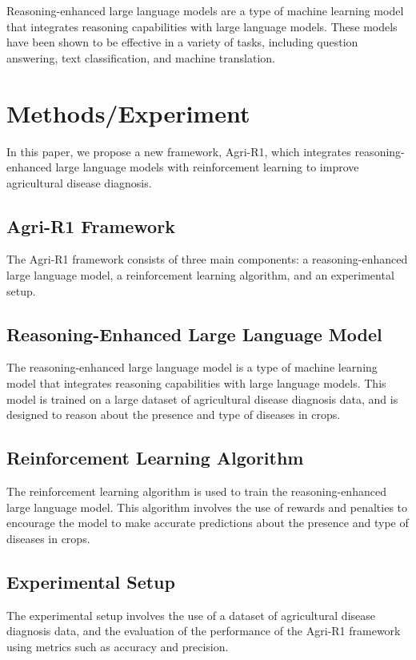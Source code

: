 \documentclass{article}
\begin{document}
Reasoning-enhanced large language models are a type of machine learning model that integrates reasoning capabilities with large language models. These models have been shown to be effective in a variety of tasks, including question answering, text classification, and machine translation.

\section{Methods/Experiment}

In this paper, we propose a new framework, Agri-R1, which integrates reasoning-enhanced large language models with reinforcement learning to improve agricultural disease diagnosis.

\subsection{Agri-R1 Framework}

The Agri-R1 framework consists of three main components: a reasoning-enhanced large language model, a reinforcement learning algorithm, and an experimental setup.

\subsection{Reasoning-Enhanced Large Language Model}

The reasoning-enhanced large language model is a type of machine learning model that integrates reasoning capabilities with large language models. This model is trained on a large dataset of agricultural disease diagnosis data, and is designed to reason about the presence and type of diseases in crops.

\subsection{Reinforcement Learning Algorithm}

The reinforcement learning algorithm is used to train the reasoning-enhanced large language model. This algorithm involves the use of rewards and penalties to encourage the model to make accurate predictions about the presence and type of diseases in crops.

\subsection{Experimental Setup}

The experimental setup involves the use of a dataset of agricultural disease diagnosis data, and the evaluation of the performance of the Agri-R1 framework using metrics such as accuracy and precision.
\end{document}
